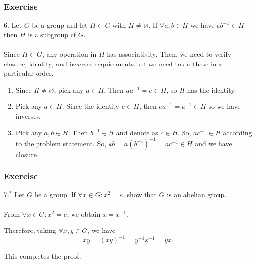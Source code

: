 \documentclass{beamer}
\begin{document}
\begin{frame}
    \frametitle{Exercise}
    6. Let $G$ be a group and let $H \subset G$ with $H \neq \varnothing$. 
    If $\forall a, b \in H$ we have $ab^{-1} \in H$ then $H$ is a subgroup of $G$.
    \pause
    \\\vv{}\\
    \hh Since $H \subset G$, any operation in $H$ has associativity. Then, we need to verify closure, identity, and inverses requirements but we need to
    do these in a particular order. 
    \begin{enumerate}
        \item  Since $H \neq \varnothing$, pick any $a \in H$. Then $aa^{-1} = e \in H$, so $H$ has the identity.
        \item Pick any $a \in H$. Since the identity $e \in H$, then $ea^{-1} = a^{-1} \in H$ so we have inverses. 
        \item Pick any $a, b \in H$. Then $b^{-1} \in H$ and denote as $c \in H$. So, $ac^{-1} \in H$ according to the problem statement. So, $ab = a(b^{-1})^{-1} = ac^{-1} \in H$ and we have closure.	
    \end{enumerate}
\end{frame}
\begin{frame}
    \frametitle{Exercise}
    7.$^*$ Let $G$ be a group. If $\forall x \in G : x^2 = e$, show that $G$ is an abelian group.
    \\ \vv
    \\ \vv
    From $\forall x \in G : x^2 = e$, we obtain $x = x^{-1}$.
    \par Therefore, taking $\forall x,y \in G$, we have $$xy = (xy)^{-1} = y^{-1}x^{-1} = yx.$$
    \par This completes the proof.
    
\end{frame}
\end{document}
